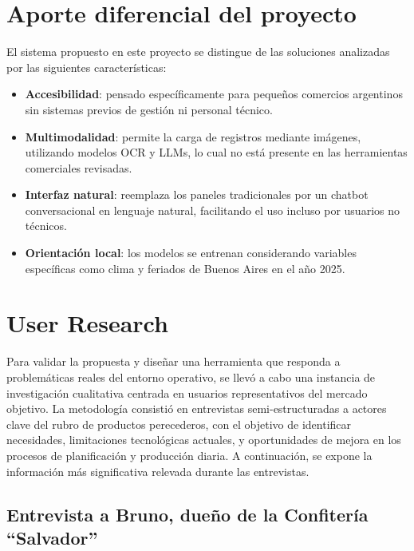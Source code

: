 \section{Aporte diferencial del proyecto}

El sistema propuesto en este proyecto se distingue de las soluciones analizadas por las siguientes características:

\begin{itemize}
    \item \textbf{Accesibilidad}: pensado específicamente para pequeños comercios argentinos sin sistemas previos de gestión ni personal técnico.

    \item \textbf{Multimodalidad}: permite la carga de registros mediante imágenes, utilizando modelos OCR y LLMs, lo cual no está presente en las herramientas comerciales revisadas.

    \item \textbf{Interfaz natural}: reemplaza los paneles tradicionales por un chatbot conversacional en lenguaje natural, facilitando el uso incluso por usuarios no técnicos.

    \item \textbf{Orientación local}: los modelos se entrenan considerando variables específicas como clima y feriados de Buenos Aires en el año 2025.
\end{itemize}


\section{User Research}

Para validar la propuesta y diseñar una herramienta que responda a problemáticas reales del entorno operativo, se llevó a cabo una instancia de investigación cualitativa centrada en usuarios representativos del mercado objetivo. La metodología consistió en entrevistas semi-estructuradas a actores clave del rubro de productos perecederos, con el objetivo de identificar necesidades, limitaciones tecnológicas actuales, y oportunidades de mejora en los procesos de planificación y producción diaria. A continuación, se expone la información más significativa relevada durante las entrevistas.

\subsection{Entrevista a Bruno, dueño de la Confitería ``Salvador''}

